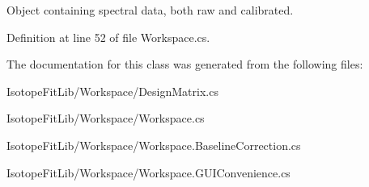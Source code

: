 Object containing spectral data, both raw and calibrated. 



Definition at line 52 of file Workspace.\+cs.



The documentation for this class was generated from the following files\+:\begin{DoxyCompactItemize}
\item 
Isotope\+Fit\+Lib/\+Workspace/Design\+Matrix.\+cs\item 
Isotope\+Fit\+Lib/\+Workspace/Workspace.\+cs\item 
Isotope\+Fit\+Lib/\+Workspace/Workspace.\+Baseline\+Correction.\+cs\item 
Isotope\+Fit\+Lib/\+Workspace/Workspace.\+G\+U\+I\+Convenience.\+cs\end{DoxyCompactItemize}
